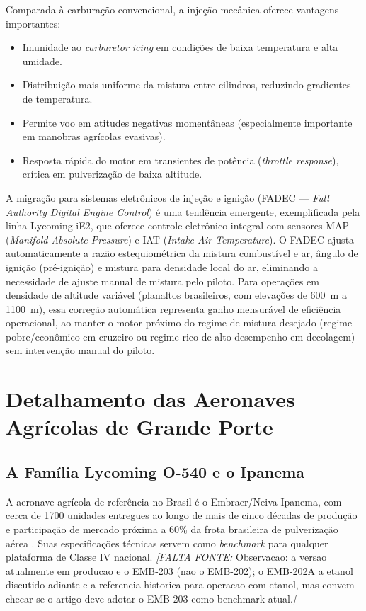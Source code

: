 \documentclass[a4paper,12pt]{article}
\newcommand{\citesugerida}[1]{{\color{red}\textit{[FALTA FONTE: }#1\textit{]}}}
\begin{document}
Comparada à carburação convencional, a injeção mecânica oferece vantagens importantes:

\begin{itemize}
    \item Imunidade ao \textit{carburetor icing} em condições de baixa temperatura e alta umidade.
    \item Distribuição mais uniforme da mistura entre cilindros, reduzindo gradientes de temperatura.
    \item Permite voo em atitudes negativas momentâneas (especialmente importante em manobras agrícolas evasivas).
    \item Resposta rápida do motor em transientes de potência (\textit{throttle response}), crítica em pulverização de baixa altitude.
\end{itemize}

A migração para sistemas eletrônicos de injeção e ignição (FADEC --- \textit{Full Authority Digital Engine Control}) é uma tendência emergente, exemplificada pela linha Lycoming iE2, que oferece controle eletrônico integral com sensores MAP (\textit{Manifold Absolute Pressure}) e IAT (\textit{Intake Air Temperature}). O FADEC ajusta automaticamente a razão estequiométrica da mistura combustível e ar, ângulo de ignição (pré-ignição) e mistura para densidade local do ar, eliminando a necessidade de ajuste manual de mistura pelo piloto. Para operações em densidade de altitude variável (planaltos brasileiros, com elevações de \SI{600}{m} a \SI{1100}{m}), essa correção automática representa ganho mensurável de eficiência operacional, ao manter o motor próximo do regime de mistura desejado (regime pobre/econômico em cruzeiro ou regime rico de alto desempenho em decolagem) sem intervenção manual do piloto. %



\section{Detalhamento das Aeronaves Agrícolas de Grande Porte}
\label{sec:classe4}

\subsection{A Família Lycoming O-540 e o Ipanema}

A aeronave agrícola de referência no Brasil é o Embraer/Neiva Ipanema, com cerca de \num{1700} unidades entregues ao longo de mais de cinco décadas de produção e participação de mercado próxima a 60\% da frota brasileira de pulverização aérea \cite{embraer_1700}. Suas especificações técnicas servem como \textit{benchmark} para qualquer plataforma de Classe IV nacional. \citesugerida{Observacao: a versao atualmente em producao e o EMB-203 (nao o EMB-202); o EMB-202A a etanol discutido adiante e a referencia historica para operacao com etanol, mas convem checar se o artigo deve adotar o EMB-203 como benchmark atual.}
\end{document}
